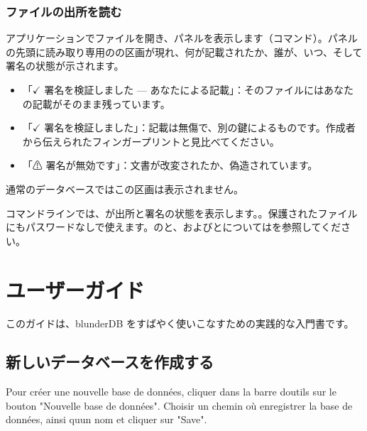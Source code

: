 \documentclass[letterpaper,10pt,dvipdfmx]{sphinxmanual}
\begin{document}
\subsubsection{ファイルの出所を読む}
\label{\detokenize{manuel:lire-l-origine-d-un-fichier}}
\sphinxAtStartPar
アプリケーションでファイルを開き、パネルを表示します（コマンド）。パネルの先頭に読み取り専用のの区画が現れ、何が記載されたか、誰が、いつ、そして署名の状態が示されます。
\begin{itemize}
\item {} 
\sphinxAtStartPar
「\(\checkmark\) 署名を検証しました — あなたによる記載」：そのファイルにはあなたの記載がそのまま残っています。

\item {} 
\sphinxAtStartPar
「\(\checkmark\) 署名を検証しました」：記載は無傷で、別の鍵によるものです。作成者から伝えられたフィンガープリントと見比べてください。

\item {} 
\sphinxAtStartPar
「⚠ 署名が無効です」：文書が改変されたか、偽造されています。

\end{itemize}

\sphinxAtStartPar
通常のデータベースではこの区画は表示されません。

\sphinxAtStartPar
コマンドラインでは、が出所と署名の状態を表示します。。保護されたファイルにもパスワードなしで使えます。のと、およびとについてはを参照してください。

\sphinxstepscope


\section{ユーザーガイド}
\label{\detokenize{guide_utilisateur:guide-utilisateur}}\label{\detokenize{guide_utilisateur:id1}}\label{\detokenize{guide_utilisateur::doc}}
\sphinxAtStartPar
このガイドは、blunderDB をすばやく使いこなすための実践的な入門書です。


\subsection{新しいデータベースを作成する}
\label{\detokenize{guide_utilisateur:creer-une-nouvelle-base-de-donnees}}
\sphinxAtStartPar
Pour créer une nouvelle base de données, cliquer dans la barre d\textquotesingle{}outils sur le
bouton "Nouvelle base de données". Choisir un chemin où enregistrer la base de
données, ainsi qu\textquotesingle{}un nom et cliquer sur "Save".
\end{document}
